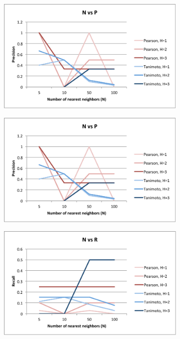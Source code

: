 \documentclass{article}
\begin{document}
\begin{figure}[h]
\centering
\begin{subfigure}{.4\textwidth}
  \centering
  \includegraphics[width=\linewidth]{img/nvp.pdf}
  \label{fig:nvp}
\end{subfigure}%
\begin{subfigure}{.4\textwidth}
  \centering
  \includegraphics[width=\linewidth]{img/nvp.pdf}
  \label{fig:tvp}
\end{subfigure}
\begin{subfigure}{.4\textwidth}
  \centering
  \includegraphics[width=\linewidth]{img/nvr.pdf}

\end{subfigure}
\end{figure}
\end{document}
